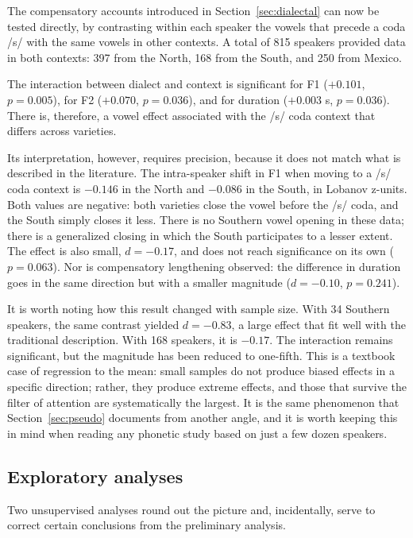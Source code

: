 \documentclass[11pt]{article}
\begin{document}
The compensatory accounts introduced in Section~\ref{sec:dialectal} can now be
tested directly, by contrasting within each speaker the vowels that precede a
coda /s/ with the same vowels in other contexts. A total of 815 speakers provided
data in both contexts: 397 from the North, 168 from the South, and 250 from
Mexico.

The interaction between dialect and context is significant for F1 ($+0.101$,
$p = 0.005$), for F2 ($+0.070$, $p = 0.036$), and for duration ($+0.003$ s,
$p = 0.036$). There is, therefore, a vowel effect associated with the /s/ coda
context that differs across varieties.

Its interpretation, however, requires precision, because it does not match what
is described in the literature. The intra-speaker shift in F1 when moving to a
/s/ coda context is $-0.146$ in the North and $-0.086$ in the South, in Lobanov
z-units. Both values are negative: both varieties close the vowel before the /s/
coda, and the South simply closes it less. There is no Southern vowel opening in
these data; there is a generalized closing in which the South participates to a
lesser extent. The effect is also small, $d = -0.17$, and does not reach
significance on its own ($p = 0.063$). Nor is compensatory lengthening observed:
the difference in duration goes in the same direction but with a smaller
magnitude ($d = -0.10$, $p = 0.241$).

It is worth noting how this result changed with sample size. With 34 Southern
speakers, the same contrast yielded $d = -0.83$, a large effect that fit well
with the traditional description. With 168 speakers, it is $-0.17$. The
interaction remains significant, but the magnitude has been reduced to one-fifth.
This is a textbook case of regression to the mean: small samples do not produce
biased effects in a specific direction; rather, they produce extreme effects, and
those that survive the filter of attention are systematically the largest. It is
the same phenomenon that Section~\ref{sec:pseudo} documents from another angle,
and it is worth keeping this in mind when reading any phonetic study based on
just a few dozen speakers.

\subsection{Exploratory analyses}

Two unsupervised analyses round out the picture and, incidentally, serve to
correct certain conclusions from the preliminary analysis.
\end{document}
